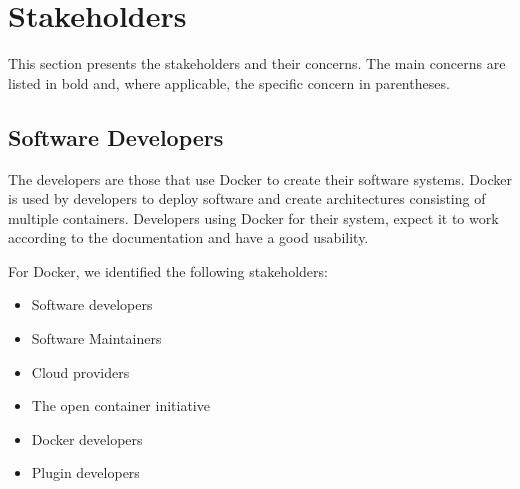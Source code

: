 
\section{Stakeholders}
\label{sec:stakeholders}
This section presents the stakeholders and their concerns. The main concerns are listed in bold and, where applicable, the specific concern in parentheses.

\subsection*{Software Developers}
The developers are those that use Docker to create their software systems. Docker is used by developers to deploy software and create architectures consisting of multiple containers. Developers using Docker for their system, expect it to work according to the documentation and have a good usability.

For Docker, we identified the following stakeholders:
\begin{itemize}
\item Software developers
\item Software Maintainers
\item Cloud providers
\item The open container initiative
\item Docker developers
\item Plugin developers
\end{itemize}

